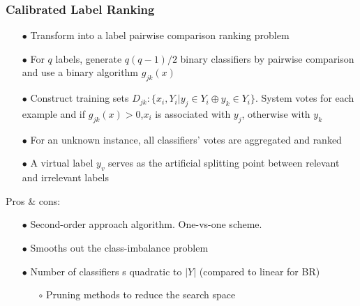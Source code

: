 \documentclass{beamer}
\begin{document}
\begin{frame}
\frametitle{Calibrated Label Ranking}
\begin{itemize}
\item[$\bullet$] Transform into a label pairwise comparison ranking problem
\item[$\bullet$] For $q$ labels, generate $q(q-1)/2$ binary classifiers by pairwise comparison and use a binary algorithm $g_{jk}(x)$
\item[$\bullet$] Construct training sets $D_{jk} : \{x_i, Y_i | y_j \in Y_i \oplus y_k \in Y_i\}$. System votes for each example and if $g_{jk}(x) >0$,$x_i$ is associated with $y_j$, otherwise with $y_k$
\item[$\bullet$] For an unknown instance, all classifiers' votes are aggregated and ranked
\item[$\bullet$] A virtual label $y_v$ serves as the artificial splitting point between relevant and irrelevant labels
\end{itemize}
Pros \& cons:
\begin{itemize}
\item[$\bullet$] Second-order approach algorithm. One-vs-one scheme.
\item[$\bullet$] Smooths out the class-imbalance problem
\item[$\bullet$] Number of classifiers s quadratic to $|Y|$ (compared to linear for BR)
\begin{itemize}
\item[$\circ$] Pruning methods to reduce the search space
\end{itemize}
\end{itemize}
\end{frame}
\end{document}
